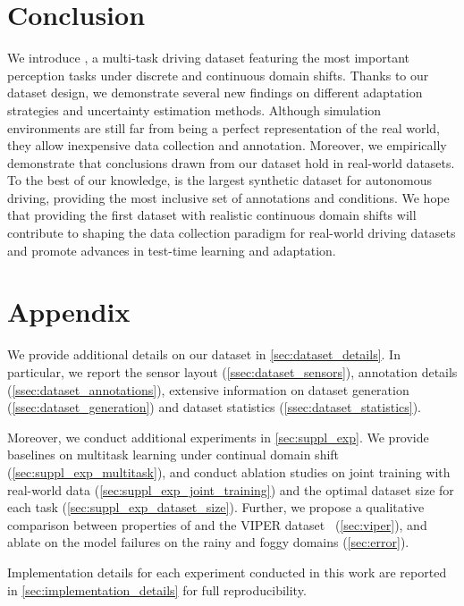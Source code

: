 \section{Conclusion}
We introduce \thedataset{}, a multi-task driving dataset featuring the most important perception tasks under discrete and continuous domain shifts.
Thanks to our dataset design, we demonstrate several new findings on different adaptation strategies and uncertainty estimation methods.
Although simulation environments are still far from being a perfect representation of the real world, they allow inexpensive data collection and annotation.
Moreover, we empirically demonstrate that conclusions drawn from our dataset hold in real-world datasets.
To the best of our knowledge, \thedataset{} is the largest synthetic dataset for autonomous driving, providing the most inclusive set of annotations and conditions.
We hope that providing the first dataset with realistic continuous domain shifts will contribute to shaping the data collection paradigm for real-world driving datasets and promote advances in test-time learning and adaptation.

\clearpage
{\small
}

\clearpage

\section*{Appendix}
We provide additional details on our dataset in \autoref{sec:dataset_details}.
In particular, we report the sensor layout (\autoref{ssec:dataset_sensors}), annotation details (\autoref{ssec:dataset_annotations}), extensive information on dataset generation (\autoref{ssec:dataset_generation}) and dataset statistics (\autoref{ssec:dataset_statistics}).

Moreover, we conduct additional experiments in \autoref{sec:suppl_exp}. 
We provide baselines on multitask learning under continual domain shift (\autoref{sec:suppl_exp_multitask}), and conduct ablation studies on joint training with real-world data (\autoref{sec:suppl_exp_joint_training}) and the optimal dataset size for each task (\autoref{sec:suppl_exp_dataset_size}). Further, we propose a qualitative comparison between properties of \thedataset{} and the VIPER dataset~\cite{Richter_2017} (\autoref{sec:viper}), and ablate on the model failures on the rainy and foggy domains (\autoref{sec:error}).

Implementation details for each experiment conducted in this work are reported in \autoref{sec:implementation_details} for full reproducibility.

